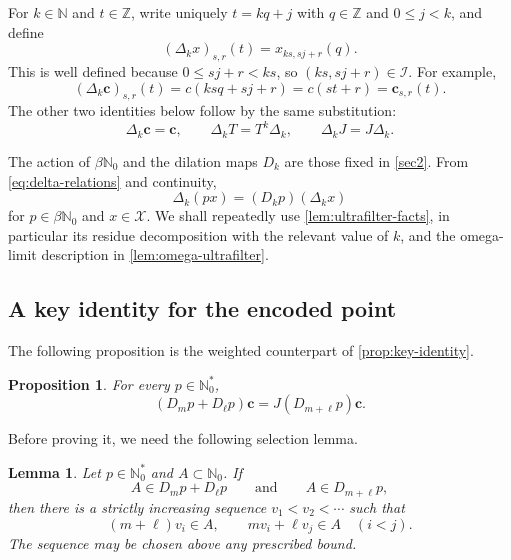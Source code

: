 \documentclass[reqno,12pt]{amsart}
\newtheorem{lemma}[thm]{Lemma}
\newtheorem{prop}[thm]{Proposition}
\newcommand{\Nzero}{\mathbb N_0}
\newcommand{\bN}{\beta\Nzero}
\newcommand{\Nstar}{\Nzero^{*}}
\def \N {\mathbb N}
\def \Z {\mathbb Z}
\numberwithin{equation}{section}
\begin{document}
For $k\in\N$ and $t\in\Z$, write uniquely $t=kq+j$ with
$q\in\Z$ and $0\leq j<k$, and define
\begin{equation}\label{eq:deltak}
 (\Delta_kx)_{s,r}(t)=x_{ks,sj+r}(q).
\end{equation}
This is well defined because
$0\leq sj+r<ks$, so $(ks,sj+r)\in\mathcal I$.  For example,
\[
 (\Delta_k\mathbf c)_{s,r}(t)
 =c(ksq+sj+r)=c(st+r)=\mathbf c_{s,r}(t).
\]
The other two identities below follow by the same substitution:
\begin{equation}\label{eq:delta-relations}
 \Delta_k\mathbf c=\mathbf c,
 \qquad
 \Delta_kT=T^k\Delta_k,
 \qquad
 \Delta_kJ=J\Delta_k.
\end{equation}

The action of $\bN$ and the dilation maps $D_k$ are those fixed in
\cref{sec2}.  From \eqref{eq:delta-relations} and continuity,
\begin{equation}\label{eq:delta-ultra}
 \Delta_k(px)=(D_k p)(\Delta_kx)
\end{equation}
for $p\in\bN$ and $x\in\mathcal X$.  We shall repeatedly use
\cref{lem:ultrafilter-facts}, in particular its residue decomposition
with the relevant value of $k$, and the omega-limit description in
\cref{lem:omega-ultrafilter}.

\subsection{A key identity for the encoded point}

The following proposition is the weighted counterpart of
\cref{prop:key-identity}.
\begin{prop}\label{prop:key}
For every $p\in\Nstar$,
\begin{equation}\label{eq:key}
 (D_m p+D_\ell p)\mathbf c=J(D_{m+\ell} p)\mathbf c.
\end{equation}
\end{prop}

Before proving it, we need the following selection lemma.

\begin{lemma}\label{lem:weighted-selection}
Let $p\in\Nstar$ and $A\subset\Nzero$. If
\[
 A\in D_m p+D_\ell p
 \qquad\text{and}\qquad
 A\in D_{m+\ell} p,
\]
then there is a strictly increasing sequence $v_1<v_2<\cdots$ such that
\[
 (m+\ell)v_i\in A,
 \qquad
 mv_i+\ell v_j\in A
 \quad(i<j).
\]
The sequence may be chosen above any prescribed bound.
\end{lemma}
\end{document}
